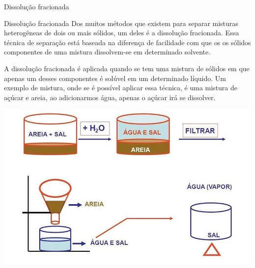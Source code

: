 \documentclass{beamer}
\begin{document}
\begin{frame}[label={sec:org9a944fa}]{Dissolução fracionada}
\begin{block}{Dissolução fracionada}
Dos muitos métodos que existem para separar misturas heterogêneas de dois ou mais sólidos, um deles é a dissolução fracionada. Essa técnica de separação está baseada na diferença de facilidade com que os os sólidos componentes de uma mistura dissolvem-se em determinado solvente.

A dissolução fracionada é aplicada quando se tem uma mistura de sólidos em que apenas um desses componentes é solúvel em um determinado líquido. Um exemplo de mistura, onde se é possível aplicar essa técnica, é uma mistura de açúcar e areia, ao adicionarmos água, apenas o açúcar irá se dissolver.

\begin{center}
\includegraphics[scale=0.3]{../img/dissolucao.jpg}
\end{center}
\end{block}
\end{frame}
\end{document}
